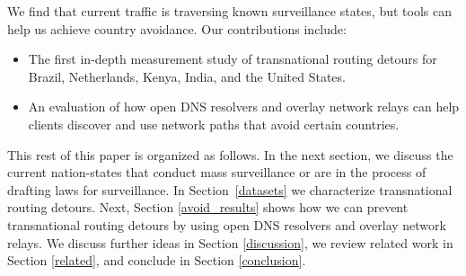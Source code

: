 We find that current traffic is traversing known surveillance states, but tools can help us achieve country avoidance. Our contributions 
include: 

\begin{itemize}
\item The first in-depth measurement study of
  transnational routing detours for Brazil, Netherlands, Kenya, India, and the
  United States. 
\item An evaluation of how open DNS resolvers and overlay
  network relays can help clients discover and use
  network paths that avoid certain countries.
\end{itemize}
\noindent

This rest of this paper is organized as follows.  In the next section, we discuss
the current nation-states that conduct mass surveillance or are in the 
process of drafting laws for surveillance.  In
Section~\ref{datasets} we characterize transnational routing detours. Next, Section
\ref{avoid_results} shows how we can prevent transnational routing detours by using open DNS resolvers
and overlay network relays.  We discuss further ideas in Section
\ref{discussion}, we review related work in Section \ref{related}, and
conclude in Section \ref{conclusion}. 
